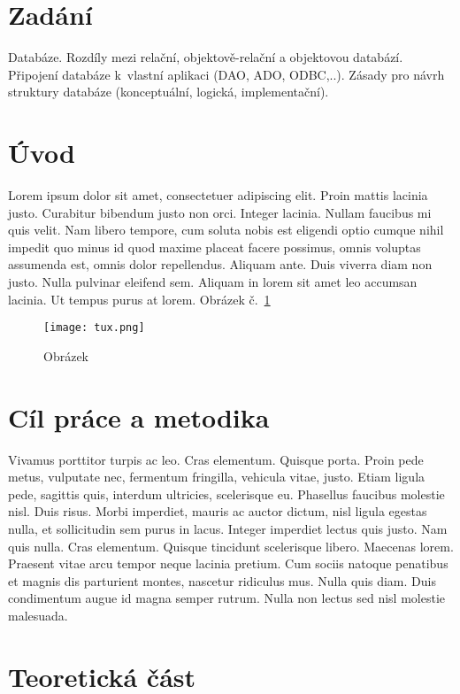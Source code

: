 \section*{Zadání}
Databáze. Rozdíly mezi relační, objektově-relační a objektovou databází. Připojení databáze k vlastní aplikaci (DAO, ADO, ODBC,..). Zásady pro návrh struktury databáze (konceptuální, logická, implementační).

\section{Úvod}
Lorem ipsum dolor sit amet, consectetuer adipiscing elit. Proin mattis lacinia justo. Curabitur bibendum justo non orci. Integer lacinia. Nullam faucibus mi quis velit. Nam libero tempore, cum soluta nobis est eligendi optio cumque nihil impedit quo minus id quod maxime placeat facere possimus, omnis voluptas assumenda est, omnis dolor repellendus. Aliquam ante. Duis viverra diam non justo. Nulla pulvinar eleifend sem. Aliquam in lorem sit amet leo accumsan lacinia. Ut tempus purus at lorem. Obrázek č.~\ref{fig:tux}

\begin{figure}[htbp]
  \centering
  \texttt{[image: tux.png]}
  \caption{Obrázek}
  \label{fig:tux}
\end{figure}

\section{Cíl práce a metodika}
Vivamus porttitor turpis ac leo\cite{becker_fiducie_2007}. Cras elementum. Quisque porta. Proin pede metus, vulputate nec, fermentum fringilla, vehicula vitae, justo. Etiam ligula pede, sagittis quis, interdum ultricies, scelerisque eu. Phasellus faucibus molestie nisl. Duis risus. Morbi imperdiet, mauris ac auctor dictum, nisl ligula egestas nulla, et sollicitudin sem purus in lacus. Integer imperdiet lectus quis justo. Nam quis nulla. Cras elementum. Quisque tincidunt scelerisque libero. Maecenas lorem. Praesent vitae arcu tempor neque lacinia pretium. Cum sociis natoque penatibus et magnis dis parturient montes, nascetur ridiculus mus. Nulla quis diam. Duis condimentum augue id magna semper rutrum. Nulla non lectus sed nisl molestie malesuada.

\section{Teoretická část}

